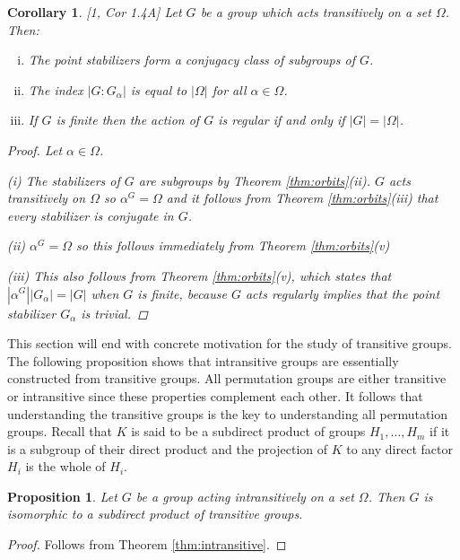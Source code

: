 \documentclass[]{article}
\newtheorem{prop}[thm]{Proposition}
\newtheorem{cor}[thm]{Corollary}
\theoremstyle{definition}
\begin{document}
\begin{cor} \label{cor:transorbits} \emph{[1, Cor 1.4A]}
Let $G$ be a group which acts transitively on a set $\Omega$. Then:
\begin{enumerate}[(i)]
\item The point stabilizers form a conjugacy class of subgroups of $G$.
\vspace{-0.2cm} \item The index $|G:G_\alpha|$ is equal to $|\Omega|$ for all $\alpha \in \Omega$.
\vspace{-0.2cm} \item If $G$ is finite then the action of $G$ is regular if and only if $|G| = |\Omega|$.
\end{enumerate}

\begin{proof} Let $\alpha \in \Omega$.

(i) The stabilizers of $G$ are subgroups by Theorem \ref{thm:orbits}(ii). $G$ acts transitively on $\Omega$ so $\alpha^G = \Omega$ and it follows from Theorem \ref{thm:orbits}(iii) that every stabilizer is conjugate in $G$.

(ii) $\alpha^G=\Omega$ so this follows immediately from Theorem \ref{thm:orbits}(v) 

(iii) This also follows from Theorem \ref{thm:orbits}(v), which states that $|\alpha^G||G_\alpha| = |G|$ when $G$ is finite, because $G$ acts regularly implies that the point stabilizer $G_\alpha$ is trivial.
\end{proof}
\end{cor}

This section will end with concrete motivation for the study of transitive groups. The following proposition shows that intransitive groups are essentially constructed from transitive groups. All permutation groups are either transitive or intransitive since these properties complement each other. It follows that understanding the transitive groups is the key to understanding all permutation groups. Recall that $K$ is said to be a subdirect product of groups $H_1,\dots,H_m$ if it is a subgroup of their direct product and the projection of $K$ to any direct factor $H_i$ is the whole of $H_i$.

\begin{prop}
Let $G$ be a group acting intransitively on a set $\Omega$. Then $G$ is isomorphic to a subdirect product of transitive groups. 
\end{prop}

\begin{proof}
	Follows from Theorem \ref{thm:intransitive}.
\end{proof}
\end{document}
